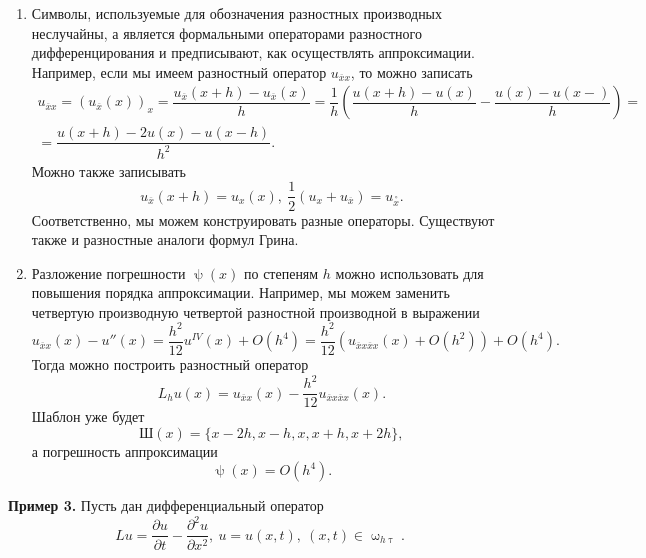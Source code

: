 \documentclass[a4paper, 12pt]{report}
\numberwithin{equation}{section}
\newcommand{\ol}{\overline}
\renewcommand{\tau}{\uptau}
\renewcommand{\psi}{\uppsi}
\renewcommand{\omega}{\upomega}
\renewcommand{\d}{\partial}
\begin{document}
\begin{enumerate}
	\item Символы, используемые для обозначения разностных производных неслучайны, а является формальными операторами разностного дифференцирования и предписывают, как осуществлять аппроксимации. Например, если мы имеем разностный оператор $u_{\ol x x}$, то можно записать
	\begin{multline*}
		u_{\ol x x} = (u_{\ol x}(x))_x = \dfrac{u_{\ol x}(x+h) - u_{\ol x}(x)}{h} = \dfrac{1}{h}\left(\dfrac{u(x+h) - u(x)}{h} - \dfrac{u(x) - u(x-)}{h}\right) =\\= \dfrac{u(x+h) - 2u(x) - u(x-h)}{h^2}.
	\end{multline*}
	Можно также записывать $$u_{\ol x}(x+h) = u_x(x),\ \dfrac12 (u_x + u_{\ol x}) = u_{ \overset{\circ}{x}}.$$ Соответственно, мы можем конструировать разные операторы. Существуют также и разностные аналоги формул Грина.
	\item Разложение погрешности $\psi(x)$ по степеням $h$ можно использовать для повышения порядка аппроксимации. Например, мы можем заменить четвертую производную четвертой разностной производной в выражении $$u_{\ol x x}(x) - u''(x) = \dfrac{h^2}{12} u^{IV}(x) + O(h^4) = \dfrac{h^2}{12}\left(u_{\ol x x\ol x x}(x) + O(h^2)\right) + O(h^4).$$
	Тогда можно построить разностный оператор $$L_hu(x) = u_{\ol x x}(x) - \dfrac{h^2}{12} u_{\ol x x\ol x x}(x).$$
	Шаблон уже будет $$\text{Ш}(x) = \{x-2h, x-h, x, x+h, x+2h\},$$ а погрешность аппроксимации $$\psi(x) = O(h^4).$$
\end{enumerate}
\textbf{Пример 3.} Пусть дан дифференциальный оператор $$Lu = \dfrac{\d u}{\d t} - \dfrac{\d ^2 u}{\d x ^2},\ u=u(x,t),\ (x,t) \in \omega_{h\tau}.$$
\end{document}
